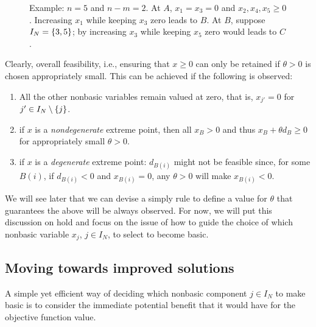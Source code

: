 \begin{figure}[h]
	\caption{Example: $n = 5$ and $n-m = 2$. At $A$, $x_1 = x_3 = 0$ and $x_2, x_4, x_5 \geq 0$. Increasing $x_1$ while keeping $x_3$ zero leads to $B$. At $B$, suppose $I_N = \left\{ 3,5 \right \}$; by increasing $x_3$ while keeping $x_5$ zero would leads to $C$.} \label{p1c3:fig:adjacent_vertices}
\end{figure}

Clearly, overall feasibility, i.e., ensuring that $x \ge 0$ can only be retained if $\theta > 0$ is chosen appropriately small. This can be achieved if the following is observed:
%
\begin{enumerate}
	\item All the other nonbasic variables remain valued at zero, that is, $x_{j'} = 0$ for $j' \in I_N \setminus \left\{ j \right \}$.	
	\item if $x$ is a \emph{nondegenerate} extreme point, then all $x_B > 0$ and thus $x_B + \theta d_B \geq 0$ for appropriately small $\theta > 0$. 
	\item if $x$ is a \emph{degenerate} extreme point: $d_{B(i)}$ might not be feasible since, for some $B(i)$, if $d_{B(i)} < 0$ and $x_{B(i)} = 0$, any $\theta > 0$ will make $x_{B(i)} < 0$.
\end{enumerate}
%
We will see later that we can devise a simply rule to define a value for $\theta$ that guarantees the above will be always observed. For now, we will put this discussion on hold and focus on the issue of how to guide the choice of which nonbasic variable $x_j$, $j \in I_N$, to select to become basic.


\subsection{Moving towards improved solutions}

A simple yet efficient way of deciding which nonbasic component $j \in I_N$ to make basic is to consider the immediate potential benefit that it would have for the objective function value. 

